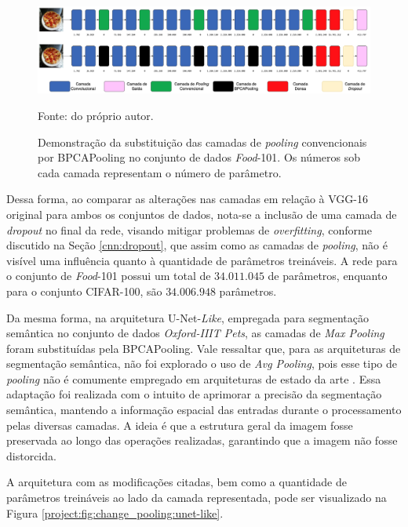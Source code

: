 \begin{figure}[H]
    \centering
    \caption[Substituição das camadas de \textit{pooling} por BPCAPooling - \textit{Food}-101.]{Demonstração da substituição das camadas de \textit{pooling} convencionais por BPCAPooling no conjunto de dados \textit{Food}-101. Os números sob cada camada representam o número de parâmetro.}
    \includegraphics[width=1\textwidth]{recursos/imagens/project/vgg-with-bpca-food.png}
    \label{project:fig:change_pooling:vgg-food}

    Fonte: do próprio autor.
\end{figure}


Dessa forma, ao comparar as alterações nas camadas em relação à VGG-16 original para ambos os conjuntos de dados, nota-se a inclusão de uma camada de \textit{dropout} no final da rede, visando mitigar problemas de \textit{overfitting}, conforme discutido na Seção \ref{cnn:dropout}, que assim como as camadas de \textit{pooling}, não é visível uma influência quanto à quantidade de parâmetros treináveis. A rede para o conjunto de \textit{Food}-101 possui um total de $34.011.045$ de parâmetros, enquanto para o conjunto CIFAR-100, são $34.006.948$ parâmetros.

Da mesma forma, na arquitetura U-Net-\textit{Like}, empregada para segmentação semântica no conjunto de dados \textit{Oxford-IIIT Pets}, as camadas de \textit{Max Pooling} foram substituídas pela BPCAPooling. Vale ressaltar que, para as arquiteturas de segmentação semântica, não foi explorado o uso de \textit{Avg Pooling}, pois esse tipo de \textit{pooling} não é comumente empregado em arquiteturas de estado da arte \citep{Ronneberger2015U-net:Segmentation,Kugelman2022ASegmentation}. Essa adaptação foi realizada com o intuito de aprimorar a precisão da segmentação semântica, mantendo a informação espacial das entradas durante o processamento pelas diversas camadas. A ideia é que a estrutura geral da imagem fosse preservada ao longo das operações realizadas, garantindo que a imagem não fosse distorcida.

A arquitetura com as modificações citadas, bem como a quantidade de parâmetros treináveis ao lado da camada representada, pode ser visualizado na Figura \ref{project:fig:change_pooling:unet-like}.

